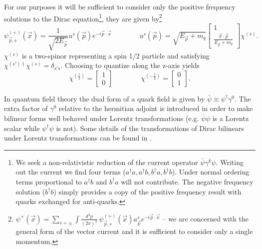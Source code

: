 For our purposes it will be sufficient to consider only the positive frequency solutions to the Dirac equation\footnote{We seek a non-relativistic reduction of the current operator $\bar{\psi}\gamma^k\psi$. Writing out the current we find four terms ($a^\dagger a, a^\dagger b , b^\dagger a, b^\dagger b$). Under normal ordering terms proportional to $a^\dagger b $  and $b^\dagger a$ will not contribute. The negative frequency solution ($b^\dagger b$) simply provides a copy of the positive frequency result with quarks exchanged for anti-quarks.}, they are given by\footnote{$\psi^{+}(\vec{x}) = \sum_{s=\pm}\int \frac{d^3p}{(2\pi)^3} \ \psi^{(+)}_{ \vec{p} ,s}(\vec{x})a^s_{\vec{p}}e^{-i\vec{p}\cdot\vec{x}}$ -- we are concerned with the general form of the vector current and it is sufficient to consider only a single momentum.}
\begin{equation*}
\psi^{(+)}_{ \vec{p} ,s}(\vec{x}) = \frac{1}{\sqrt{2E_{\vec{p}}}} u^s(\vec{p}) e^{-i\vec{p}\cdot\vec{x}} \qquad \qquad u^s(\vec{p}) = \sqrt{E_{\vec{p}} + m_q} \begin{bmatrix}1\\ \frac{\vec{\sigma}\cdot \vec{p}}{E_{\vec{p}} + m_q}\end{bmatrix}\chi^{(s)}.
\end{equation*}
$\chi^{(s)}$ is a two-spinor representing a spin 1/2 particle and satisfying $\chi^{(s')\dagger}\chi^{(s)} = \delta_{s's}$. Choosing to quantize along the z-axis yields
\begin{equation*}
\chi^{(\frac{1}{2})} = \begin{bmatrix}1 \\ 0 \end{bmatrix} \qquad \qquad 
\chi^{(-\frac{1}{2})} = \begin{bmatrix}0 \\ 1 \end{bmatrix}.
\end{equation*}

In quantum field theory the dual form of a quark field is given by $\bar{\psi} \equiv \psi^\dagger \gamma^0$. The extra factor of $\gamma^0$ relative to the hermitian adjoint is introduced in order to make bilinear forms well behaved under Lorentz transformations (e.g. $\bar{\psi}\psi$ is a Lorentz scalar while $\psi^\dagger \psi$ is not). Some details of the transformations of Dirac bilinears under Lorentz transformations can be found in .

